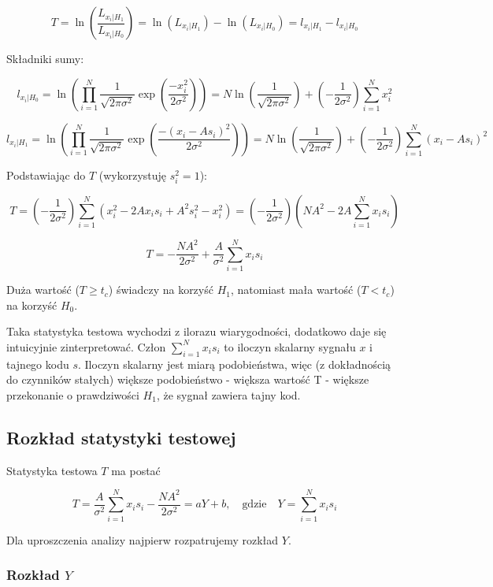 \documentclass[12pt,a4paper]{article}
\begin{document}
$$T = \ln \left( \frac{L_{x_i | H_1}}{L_{x_i | H_0}} \right) = \ln(L_{x_i | H_1}) - \ln(L_{x_i | H_0}) = l_{x_i | H_1} - l_{x_i | H_0}$$

Składniki sumy:

$$
l_{x_i | H_0} =
\ln \left( \prod_{i=1}^N \frac{1}{\sqrt{2 \pi \sigma^2}} \exp \left( \frac{-x_i^2}{2 \sigma^2} \right) \right) =
N \ln\left(\frac{1}{\sqrt{2 \pi \sigma^2}}\right) + \left(-\frac{1}{2\sigma^2}\right) \sum_{i=1}^N x_i^2
$$

$$
l_{x_i | H_1} =
\ln \left( \prod_{i=1}^N \frac{1}{\sqrt{2 \pi \sigma^2}} \exp \left( \frac{-(x_i - A s_i)^2}{2 \sigma^2} \right) \right) =
N \ln\left(\frac{1}{\sqrt{2 \pi \sigma^2}}\right) + \left(-\frac{1}{2\sigma^2}\right) \sum_{i=1}^N (x_i-As_i)^2
$$

Podstawiając do $T$ (wykorzystuję $s_i^2 = 1$):

$$
T = \left(-\frac{1}{2\sigma^2}\right) \sum_{i=1}^N (x_i^2 - 2 A x_i s_i + A^2 s_i^2 - x_i^2) = \left(-\frac{1}{2\sigma^2}\right) \left( NA^2 - 2A \sum_{i=1}^N x_i s_i \right)
$$

$$
T = -\frac{NA^2}{2\sigma^2} + \frac{A}{\sigma^2} \sum_{i=1}^N x_is_i
$$

Duża wartość ($T \geq t_c$) świadczy na korzyść $H_1$, natomiast mała wartość ($T < t_c$) na korzyść $H_0$.

Taka statystyka testowa wychodzi z ilorazu wiarygodności, dodatkowo daje się intuicyjnie zinterpretować.
Człon $\sum_{i=1}^N x_i s_i$ to iloczyn skalarny sygnału $x$ i tajnego kodu $s$.
Iloczyn skalarny jest miarą podobieństwa, więc (z dokładnością do czynników stałych) większe podobieństwo - większa wartość T - większe przekonanie o prawdziwości $H_1$, że sygnał zawiera tajny kod.


\subsection{Rozkład statystyki testowej}

Statystyka testowa $T$ ma postać

$$T = \frac{A}{\sigma^2} \sum_{i=1}^N x_is_i -\frac{NA^2}{2\sigma^2} = aY + b, \quad \text{gdzie} \quad Y = \sum_{i=1}^N x_i s_i$$

Dla uproszczenia analizy najpierw rozpatrujemy rozkład $Y$.

\subsubsection{Rozkład $Y$}
\end{document}
